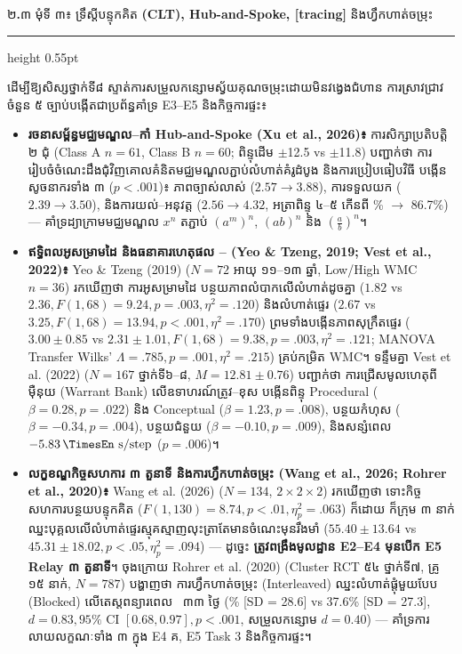\documentclass[a4paper,12pt]{article}
\newcommand{\en}[1]{{\TimesEn #1}}
\newcommand{\enbf}[1]{{\TimesEn\textbf{#1}}}
\newcommand{\unit}[1]{\,\text{\en{#1}}}
\newcommand{\cnum}[1]{{\TimesEn\fontsize{10.5pt}{12pt}\selectfont\ding{\numexpr181+#1\relax}}}
\newcommand{\subsectitle}[1]{{\muol\fontsize{11.5pt}{18.5pt}\selectfont #1}}
\newcommand{\subsec}[1]{%
  \Needspace{1.7cm}%
  \vspace{3pt}%
  \subsectitle{#1}\par%
  \vspace{-2pt}%
  {\color{black}\hrule height 0.55pt}%
  \vspace{3pt}%
}
\begin{document}
\subsec{២\enbf{.}៣ មុំទី ៣៖ ទ្រឹស្ដីបន្ទុកគិត \enbf{(CLT), Hub-and-Spoke, [tracing]} និងហ្វឹកហាត់ចម្រុះ}

ដើម្បីឱ្យសិស្សថ្នាក់ទី៨ ស្ទាត់ការសម្រួលកន្សោមស្វ័យគុណចម្រុះដោយមិនវង្វេងជំហាន ការស្រាវជ្រាវចំនួន ៥ ច្បាប់បង្កើតជាប្រព័ន្ធគាំទ្រ \en{E3--E5} និងកិច្ចការផ្ទះ៖
\begin{itemize}[leftmargin=0.65cm]
  \item \textbf{រចនាសម្ព័ន្ធមជ្ឈមណ្ឌល–កាំ \en{Hub-and-Spoke (Xu et al., 2026)}៖} ការសិក្សាប្រតិបត្តិ ២ ជុំ (\en{Class A $n = 61$, Class B $n = 60$}; ពិន្ទុដើម \en{102.3$\pm$12.5} \en{vs} \en{103.1$\pm$11.8}) បញ្ជាក់ថា ការរៀបចំចំណេះដឹងជុំវិញគោលគំនិតមជ្ឈមណ្ឌលភ្ជាប់លំហាត់គំរូដំបូង និងការប្រៀបធៀបវិធី បង្កើនសូចនាករទាំង ៣ (\en{$p < .001$})៖ ភាពច្បាស់លាស់ (\en{$2.57 \to 3.88$}), ការទទួលយក (\en{$2.39 \to 3.50$}), និងការយល់--អនុវត្ត (\en{$2.56 \to 4.32$}, អត្រាពិន្ទុ ៤--៥ កើនពី \en{19.7\% $\to$ 86.7\%}) — គាំទ្រដ្យាក្រាមមជ្ឈមណ្ឌល $x^n$ តភ្ជាប់ $(a^m)^n$, $(ab)^n$ និង $\left(\frac{a}{b}\right)^n$។
  \item \textbf{ឥទ្ធិពលអូសម្រាមដៃ \en{[tracing]} និងធនាគារហេតុផល \cnum{1}--\cnum{5} (\en{Yeo \& Tzeng, 2019; Vest et al., 2022})៖} \en{Yeo \& Tzeng (2019)} (\en{$N = 72$} អាយុ ១១--១៣ ឆ្នាំ, \en{Low/High WMC $n = 36$}) រកឃើញថា ការអូសម្រាមដៃ \en{[tracing]} បន្ថយភាពលំបាកលើលំហាត់ដូចគ្នា (\en{$1.82$ vs $2.36, F(1,68) = 9.24, p = .003, \eta^2 = .120$}) និងលំហាត់ផ្ទេរ (\en{$2.67$ vs $3.25, F(1,68) = 13.94, p < .001, \eta^2 = .170$}) ព្រមទាំងបង្កើនភាពសុក្រឹតផ្ទេរ (\en{$3.00\pm 0.85$ vs $2.31\pm 1.01, F(1,68) = 9.38, p = .003, \eta^2 = .121$}; \en{MANOVA Transfer Wilks' $\Lambda = .785, p = .001, \eta^2 = .215$}) គ្រប់កម្រិត \en{WMC}។ ទន្ទឹមគ្នា \en{Vest et al. (2022)} (\en{$N = 167$} ថ្នាក់ទី៦--៨, \en{$M = 12.81\pm 0.76$}) បញ្ជាក់ថា ការជ្រើសមូលហេតុពីម៉ឺនុយ (\en{Warrant Bank}) លើឧទាហរណ៍ត្រូវ--ខុស បង្កើនពិន្ទុ \en{Procedural ($\beta = 0.28, p = .022$)} និង \en{Conceptual ($\beta = 1.23, p = .008$)}, បន្ថយកំហុស (\en{$\beta = -0.34, p = .004$}), បន្ថយជំនួយ (\en{$\beta = -0.10, p = .009$}), និងសន្សំពេល \en{$-5.83\unit{s/step}$ ($p = .006$)}។
  \item \textbf{លក្ខខណ្ឌកិច្ចសហការ ៣ តួនាទី និងការហ្វឹកហាត់ចម្រុះ (\en{Wang et al., 2026; Rohrer et al., 2020})៖} \en{Wang et al. (2026)} (\en{$N = 134$}, \en{$2\times 2\times 2$}) រកឃើញថា ទោះកិច្ចសហការបន្ថយបន្ទុកគិត (\en{$F(1,130) = 8.74, p < .01, \eta_p^2 = .063$}) ក៏ដោយ ក៏ក្រុម ៣ នាក់ឈ្នះបុគ្គលលើលំហាត់ផ្ទេរស្មុគស្មាញលុះត្រាតែមានចំណេះមុនរឹងមាំ (\en{$55.40\pm 13.64$ vs $45.31\pm 18.02, p < .05, \eta_p^2 = .094$}) — ដូច្នេះ \textbf{ត្រូវពង្រឹងមូលដ្ឋាន \en{E2--E4} មុនបើក \en{E5 Relay} ៣ តួនាទី}។ ចុងក្រោយ \en{Rohrer et al. (2020)} (\en{Cluster RCT} ៥៤ ថ្នាក់ទី៧, គ្រូ ១៥ នាក់, \en{$N = 787$}) បង្ហាញថា ការហ្វឹកហាត់ចម្រុះ (\en{Interleaved}) ឈ្នះលំហាត់ផ្ដុំមួយបែប (\en{Blocked}) លើតេស្តពន្យារពេល ~៣៣ ថ្ងៃ (\en{60.7\% [SD = 28.6] vs 37.6\% [SD = 27.3]}, \en{$d = 0.83, 95\%\text{ CI }[0.68, 0.97], p < .001$}, សម្រួលកន្សោម \en{$d = 0.40$}) — គាំទ្រការលាយលក្ខណៈទាំង ៣ ក្នុង \en{E4} គ, \en{E5 Task 3} និងកិច្ចការផ្ទះ។
\end{itemize}
\end{document}
